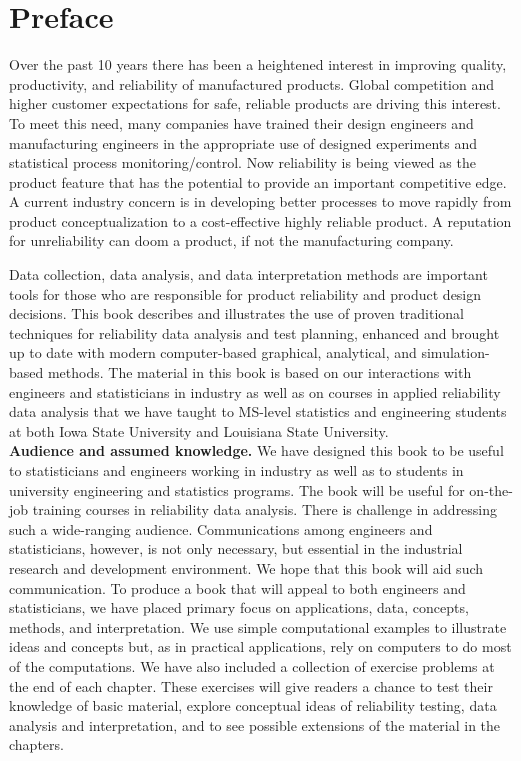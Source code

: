 \chapter*{Preface}

Over the past 10 years there has been a heightened interest in
improving quality, productivity, and reliability of manufactured
products.  Global competition and higher customer expectations for
safe, reliable products are driving this interest. To meet this
need, many companies have trained their design engineers and
manufacturing engineers in the appropriate use of designed
experiments and statistical process monitoring/control. Now
reliability is being viewed as the product feature that has the
potential to provide an important competitive edge. A current
industry concern is in developing better processes to move rapidly
from product conceptualization to a cost-effective highly reliable
product.  A reputation for unreliability can doom a product, if not
the manufacturing company.

Data collection, data analysis, and data interpretation methods are
important tools for those who are responsible for product reliability
and product design decisions.  This book describes and illustrates the
use of proven traditional techniques for reliability data analysis and
test planning, enhanced and brought up to date with modern
computer-based graphical, analytical, and simulation-based methods.
The material in this book is based on our interactions with engineers
and statisticians in industry as well as on courses in applied
reliability data analysis that we have taught to MS-level statistics
and engineering students at both Iowa State University and Louisiana
State University.\\[3ex]

\noindent
{\bf Audience and assumed knowledge.} We have designed this book to be
useful to statisticians and engineers working in industry as well as
to students in university engineering and statistics programs. The
book will be useful for on-the-job training courses in reliability
data analysis. There is challenge in addressing such a wide-ranging
audience. Communications among engineers and statisticians, however,
is not only necessary, but essential in the industrial research and
development environment. We hope that this book will aid such
communication. To produce a book that will appeal to both engineers
and statisticians, we have placed primary focus on applications, data,
concepts, methods, and interpretation. We use simple computational
examples to illustrate ideas and concepts but, as in practical
applications, rely on computers to do most of the computations. We
have also included a collection of exercise problems at the end of
each chapter. These exercises will give readers a chance to test their
knowledge of basic material, explore conceptual ideas of reliability
testing, data analysis and interpretation, and to see possible
extensions of the material in the chapters.


